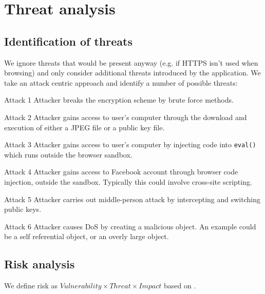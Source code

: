 \chapter{Threat analysis}
\label{app:threat}

\section{Identification of threats}

We ignore threats that would be present anyway (e.g. if HTTPS isn't used when browsing) and only consider additional threats introduced by the application. We take an attack centric approach and identify a number of possible threats:

\begin{desc}
    \item[Attack 1] Attacker breaks the encryption scheme by brute force methods.

    \item[Attack 2] Attacker gains access to user's computer through the download and execution of either a JPEG file or a public key file.

    \item[Attack 3] Attacker gains access to user's computer by injecting code into {\tt eval()} which runs outside the browser sandbox.

    \item[Attack 4] Attacker gains access to Facebook account through browser code injection, outside the sandbox. Typically this could involve cross-site scripting.

    \item[Attack 5] Attacker carries out middle-person attack by intercepting and switching public keys.

    \item[Attack 6] Attacker causes DoS by creating a malicious object. An example could be a self referential object, or an overly large object.
\end{desc}

\section{Risk analysis}

We define risk as $Vulnerability \times Threat \times Impact$ based on \cite{security}.

